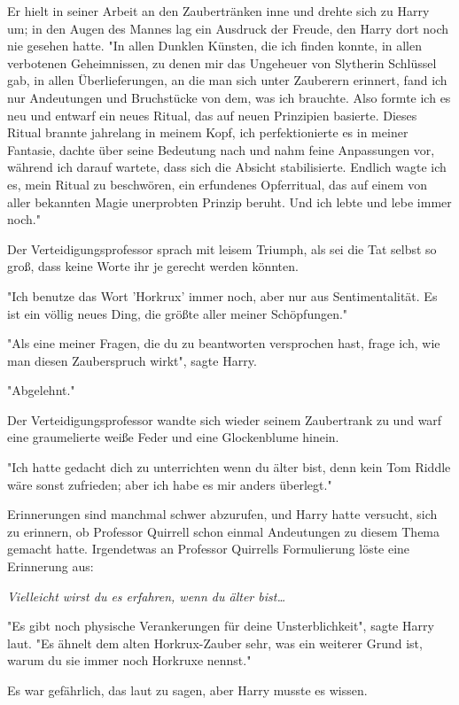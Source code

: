 {Er hielt in seiner Arbeit an den Zaubertränken inne und drehte sich zu Harry um; in den Augen des Mannes lag ein Ausdruck der Freude, den Harry dort noch nie gesehen hatte. "In allen Dunklen Künsten, die ich finden konnte, in allen verbotenen Geheimnissen, zu denen mir das Ungeheuer von Slytherin Schlüssel gab, in allen Überlieferungen, an die man sich unter Zauberern erinnert, fand ich nur Andeutungen und Bruchstücke von dem, was ich brauchte. Also formte ich es neu und entwarf ein neues Ritual, das auf neuen Prinzipien basierte. Dieses Ritual brannte jahrelang in meinem Kopf, ich perfektionierte es in meiner Fantasie, dachte über seine Bedeutung nach und nahm feine Anpassungen vor, während ich darauf wartete, dass sich die Absicht stabilisierte. Endlich wagte ich es, mein Ritual zu beschwören, ein erfundenes Opferritual, das auf einem von aller bekannten Magie unerprobten Prinzip beruht. Und ich lebte und lebe immer noch."

Der Verteidigungsprofessor sprach mit leisem Triumph, als sei die Tat selbst so groß, dass keine Worte ihr je gerecht werden könnten.

"Ich benutze das Wort 'Horkrux' immer noch, aber nur aus Sentimentalität. Es ist ein völlig neues Ding, die größte aller meiner Schöpfungen."

"Als eine meiner Fragen, die du zu beantworten versprochen hast, frage ich, wie man diesen Zauberspruch wirkt", sagte Harry.

"Abgelehnt."

Der Verteidigungsprofessor wandte sich wieder seinem Zaubertrank zu und warf eine graumelierte weiße Feder und eine Glockenblume hinein.

"Ich hatte gedacht dich zu unterrichten wenn du älter bist, denn kein Tom Riddle wäre sonst zufrieden; aber ich habe es mir anders überlegt."

Erinnerungen sind manchmal schwer abzurufen, und Harry hatte versucht, sich zu erinnern, ob Professor Quirrell schon einmal Andeutungen zu diesem Thema gemacht hatte. Irgendetwas an Professor Quirrells Formulierung löste eine Erinnerung aus:

\emph{Vielleicht wirst du es erfahren, wenn du älter bist…}

"Es gibt noch physische Verankerungen für deine Unsterblichkeit", sagte Harry laut. "Es ähnelt dem alten Horkrux-Zauber sehr, was ein weiterer Grund ist, warum du sie immer noch Horkruxe nennst."

Es war gefährlich, das laut zu sagen, aber Harry musste es wissen.

}
